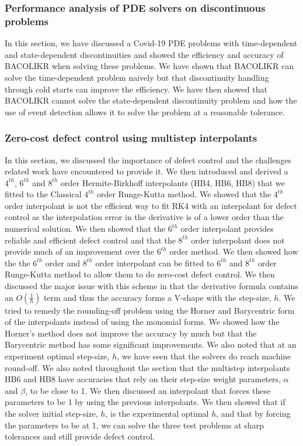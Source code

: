 \documentclass{article}
\begin{document}
\subsubsection{Performance analysis of PDE solvers on discontinuous problems}
In this section, we have discussed a Covid-19 PDE problems with time-dependent and state-dependent discontinuities and showed the efficiency and accuracy of BACOLIKR when solving these problems. We have shown that BACOLIKR can solve the time-dependent problem naively but that discontinuity handling through cold starts can improve the efficiency. We have then showed that BACOLIKR cannot solve the state-dependent discontinuity problem and how the use of event detection allows it to solve the problem at a reasonable tolerance.  

\subsubsection{Zero-cost defect control using multistep interpolants}
In this section, we discussed the importance of defect control and the challenges related work have encountered to provide it. We then introduced and derived a $4^{th}$, $6^{th}$ and $8^{th}$ order Hermite-Birkhoff interpolants (HB4, HB6, HB8) that we fitted to the Classical $4^{th}$ order Runge-Kutta method. We showed that the $4^{th}$ order interpolant is not the efficient way to fit RK4 with an interpolant for defect control as the interpolation error in the derivative is of a lower order than the numerical solution. We then showed that the $6^{th}$ order interpolant provides reliable and efficient defect control and that the $8^{th}$ order interpolant does not provide much of an improvement over the $6^{th}$ order method. We then showed how the the $6^{th}$ order and $8^{th}$ order interpolant can be fitted to $6^{th}$ and $8^{th}$ order Runge-Kutta method to allow them to do zero-cost defect control. We then discussed the major issue with this scheme in that the derivative formula contains an $O(\frac{1}{h})$ term and thus the accuracy forms a V-shape with the step-size, $h$. We tried to remedy the rounding-off problem using the Horner and Barycentric form of the interpolants instead of using the monomial forms. We showed how the Horner's method does not improve the accuracy by much but that the Barycentric method has some significant improvements. We also noted that at an experiment optimal step-size, $h$, we have seen that the solvers do reach machine round-off. We also noted throughout the section that the multistep interpolants HB6 and HB8 have accuracies that rely on their step-size weight parameters, $\alpha$ and $\beta$, to be close to 1. We then discussed an interpolant that forces these parameters to be 1 by using the previous interpolants. We then showed that if the solver initial step-size, $h$, is the experimental optimal $h$, and that by forcing the parameters to be at 1, we can solve the three test problems at sharp tolerances and still provide defect control.
\end{document}
